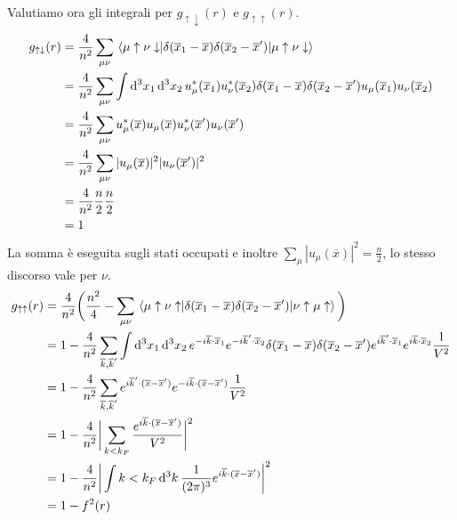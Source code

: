 Valutiamo ora gli integrali per $g_{\uparrow\downarrow}(r)$ e $g_{\uparrow\uparrow}(r)$.
\begin{equation*}
    \begin{aligned}
        g_{\uparrow\downarrow}(r) & = \frac{4}{n^2}\sum_{\mu\nu}\mel{\mu\uparrow\nu\downarrow}{\delta(\overline{x}_1-\overline x)\delta(\overline{x}_2-\overline{x}')}{\mu\uparrow\nu\downarrow} \\
        & = \frac{4}{n^2}\sum_{\mu\nu}\int \dd[3]{x_1}\dd[3]{x_2}u_\mu^*(\overline{x}_1)u_\nu^*(\overline{x}_2)\delta(\overline{x}_1-\overline{x})\delta(\overline{x}_2-\overline{x}')u_\mu(\overline{x}_1)u_\nu(\overline{x}_2) \\
        & = \frac{4}{n^2}\sum_{\mu\nu}u_\mu^*(\overline x)u_\mu(\overline x)u_\nu^*(\overline{x}')u_\nu(\overline{x}') \\
        & = \frac{4}{n^2}\sum_{\mu\nu}|u_\mu(\overline x)|^2|u_\nu(\overline{x}')|^2 \\
        & = \frac{4}{n^2}\frac n2 \frac n2 \\
        & = 1
    \end{aligned}
\end{equation*}
La somma è eseguita sugli stati occupati e inoltre $\sum_\mu|u_\mu(\overline{x})|^2=\frac n2$, lo stesso discorso vale per $\nu$.
\begin{equation*}
    \begin{aligned}
        g_{\uparrow\uparrow}(r) & = \frac{4}{n^2}\bigg(\frac {n^2}{4} - \sum_{\mu\nu}\mel{\mu\uparrow\nu\uparrow}{\delta(\overline{x}_1-\overline{x})\delta(\overline{x}_2-\overline{x}')}{\nu\uparrow\mu\uparrow}\bigg) \\
        & = 1 - \frac{4}{n^2}\sum_{\overline k, \overline{k}'}\int\dd[3]{x_1}\dd[3]{x_2}e^{-i\overline k \cdot \overline{x}_1}e^{-i\overline{k}'\cdot\overline{x}_2}\delta(\overline{x}_1-\overline{x})\delta(\overline{x}_2-\overline{x}')e^{i\overline{k}'\cdot\overline{x}_1}e^{i\overline{k}\cdot\overline{x}_2}\frac{1}{V^2} \\
        & = 1 - \frac{4}{n^2}\sum_{\overline k, \overline{k}'}e^{i\overline{k}'\cdot(\overline{x}-\overline{x}')}e^{-i\overline{k}\cdot(\overline{x}-\overline{x}')}\frac{1}{V^2} \\
        & = 1 - \frac{4}{n^2}\bigg|\sum_{k<k_F}\frac{e^{i\overline{k}\cdot(\overline{x}-\overline{x}')}}{V^2}\bigg|^2 \\
        & = 1 - \frac{4}{n^2}\bigg|\int{k<k_F}\dd[3]{k}\frac{1}{(2\pi)^3} e^{i\overline{k}\cdot(\overline{x}-\overline{x}')}\bigg|^2 \\
        & = 1 -f^2(r)
    \end{aligned}
\end{equation*}
